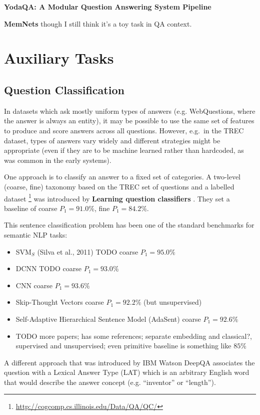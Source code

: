 \documentclass[11pt,a4paper]{article}
\begin{document}
\textbf{YodaQA: A Modular Question Answering System Pipeline} \cite{YodaQAPoster2015}

\textbf{MemNets} though I still think it's a toy task in QA context.

\section{Auxiliary Tasks}

\subsection{Question Classification}

In datasets which ask mostly uniform types of answers (e.g. WebQuestions,
where the answer is always an entity), it may be possible to use the same
set of features to produce and score answers across all questions.
However, e.g.\ in the TREC dataset, types of answers vary widely and
different strategies might be appropriate (even if they are to be machine
learned rather than hardcoded, as was common in the early systems).

One approach is to classify an answer to a fixed set of categories.
A two-level (coarse, fine) taxonomy based on the TREC set of questions and a labelled dataset%
\footnote{\url{http://cogcomp.cs.illinois.edu/Data/QA/QC/}}
was introduced by \textbf{Learning question classifiers} \cite{QCLearning}.
They set a baseline of coarse $P_1=91.0\%$, fine $P_1=84.2\%$.

This sentence classification problem has been one of the standard benchmarks
for semantic NLP tasks:
\begin{itemize}
	\item SVM$_S$ (Silva et al., 2011) TODO coarse $P_1=95.0\%$
	\item DCNN \cite{QtcDCNN} TODO coarse $P_1=93.0\%$
	\item CNN \cite{CNNSentClass} coarse $P_1=93.6\%$
	\item Skip-Thought Vectors \cite{SkipThought} coarse $P_1=92.2\%$ (but unsupervised)
	\item Self-Adaptive Hierarchical Sentence Model \cite{AdaSent} (AdaSent) coarse $P_1=92.6\%$
	\item TODO more papers; \cite{AdaSent} has some references; separate embedding and classical?, supervised and unsupervised; even primitive baseline is something like $85\%$
\end{itemize}

A different approach that was introduced by IBM Watson DeepQA \cite{WatsonTyCor}
associates the question with a Lexical Answer Type (LAT) which is
an arbitrary English word that would describe the answer concept
(e.g. ``inventor'' or ``length'').
\end{document}
